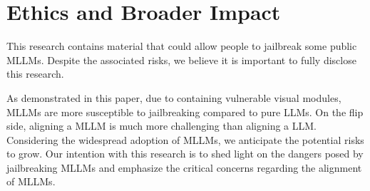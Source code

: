 \section{Ethics and Broader Impact}
This research contains material that could allow people to jailbreak some public MLLMs. Despite the associated risks, we believe it is important to fully disclose this research. 

As demonstrated in this paper, due to containing vulnerable visual modules, MLLMs are more susceptible to jailbreaking compared to pure LLMs. On the flip side, aligning a MLLM is much more challenging than aligning a LLM. Considering the widespread adoption of MLLMs, we anticipate the potential risks to grow. Our intention with this research is to shed light on the dangers posed by jailbreaking MLLMs and emphasize the critical concerns regarding the alignment of MLLMs.
 
\nocite{langley00}

